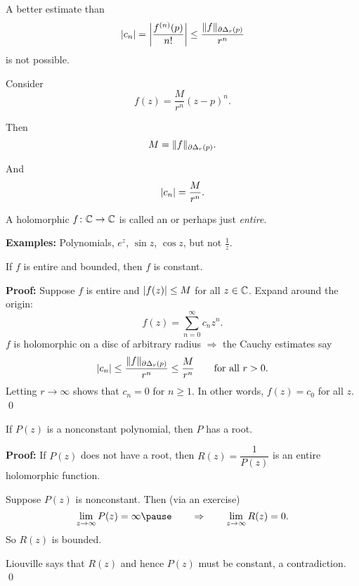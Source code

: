 \documentclass[10pt,aspectratio=169]{beamer}
\begin{document}
\begin{frame}

A better estimate than
\[
\lvert {c_n} \rvert =
\left\lvert {\frac{f^{(n)}(p)}{n!}} \right\rvert
\leq
\frac{\lVert {f} \rVert_{\partial \Delta_r(p)}}{r^{n}}
\]
is not possible.

\medskip
\pause

Consider \[
f(z) = \frac{M}{r^n} {(z-p)}^n .
\]

\medskip
\pause

Then
\[
M = \lVert {f} \rVert_{\partial \Delta_r(p)} .
\]

\medskip
\pause

And
\[
\lvert {c_n} \rvert = \frac{M}{r^n} .
\]

\end{frame}

\begin{frame}

\begin{definition}
A holomorphic $f \colon {\mathbb{C}} \to {\mathbb{C}}$ is called
an \emph{} or perhaps
just \emph{entire}.
\end{definition}

\pause

\textbf{Examples:} Polynomials, $e^z$, $\sin z$, $\cos z$, but not $\frac{1}{z}$.

\pause

\begin{theorem}[Liouville]
If $f$ is entire and bounded, then $f$ is constant.
\end{theorem}

\pause

\textbf{Proof:}
Suppose $f$ is entire and $\lvert {f(z)} \rvert \leq M$ for all $z \in {\mathbb{C}}$.
\pause
Expand around the origin:
\[
f(z) = \sum_{n=0}^\infty c_n z^n .
\]
\pause
$f$ is holomorphic on a disc of arbitrary radius
\pause \qquad $\Rightarrow$ \qquad
the Cauchy estimates say
\[
\lvert {c_n} \rvert \leq \frac{\lVert {f} \rVert_{\partial \Delta_r(p)}}{r^n} \leq
\frac{M}{r^n}
\qquad \text{for all } r > 0 .
\]
\pause
Letting $r \to \infty$ shows that $c_n = 0$ for $n \geq 1$.
\pause
In other
words, $f(z) = c_0$ for all $z$.
\qed

\end{frame}

\begin{frame}
\begin{theorem}
If $P(z)$ is a nonconstant polynomial, then $P$ has a root.
\end{theorem}

\pause

\textbf{Proof:}
If $P(z)$ does not have a root, then $R(z) = \dfrac{1}{P(z)}$ is
an entire holomorphic function.

\medskip
\pause

Suppose $P(z)$ is nonconstant.  Then (via an exercise)
\[
\lim_{z \to \infty} P(z) = \infty
\pause
\qquad \Rightarrow \qquad
\lim_{z \to \infty} R(z) = 0.
\]
\pause
So $R(z)$ is bounded.

\medskip
\pause

Liouville says that $R(z)$ and hence $P(z)$ must be constant, a
contradiction.
\qed
\end{frame}
\end{document}
